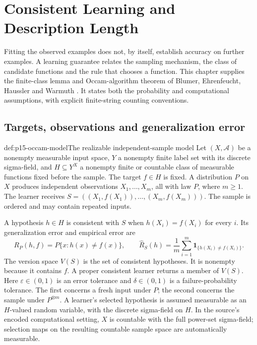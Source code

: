 \chapter{Consistent Learning and Description Length}
\label{sec:p15-occam-learning}

Fitting the observed examples does not, by itself, establish accuracy
on further examples. A learning guarantee relates the sampling mechanism,
the class of candidate functions and the rule that chooses a function.
This chapter supplies the finite-class lemma and Occam-algorithm theorem
of Blumer, Ehrenfeucht, Haussler and Warmuth
\cite[Lemma~2.1, Definition~2.2 and Theorem~2.3]{BlumerEtAl1987Occam}.
It states both the probability and computational assumptions, with
explicit finite-string counting conventions.

\section{Targets, observations and generalization error}

\begin{hbdefinition}{def:p15-occam-model}{The realizable independent-sample model}
Let \((X,\mathcal A)\) be a nonempty measurable input space,
\(Y\) a nonempty finite label set with its discrete sigma-field, and
\(H\subseteq Y^X\) a nonempty finite or countable class of measurable
functions fixed before the sample. The target
\(f\in H\) is fixed. A distribution \(P\) on \(X\) produces independent
observations \(X_1,\ldots,X_m\), all with law \(P\), where \(m\geq1\).
The learner receives
\(S=((X_1,f(X_1)),\ldots,(X_m,f(X_m)))\).
The sample is ordered and may contain repeated inputs.

A hypothesis \(h\in H\) is consistent with \(S\) when
\(h(X_i)=f(X_i)\) for every \(i\). Its generalization error and
empirical error are
\[
 R_P(h,f)=P\{x:h(x)\ne f(x)\},\qquad
 \widehat R_S(h)=\frac1m\sum_{i=1}^m
                       \mathbf1_{\{h(X_i)\ne f(X_i)\}}.
\]
The version space \(V(S)\) is the set of consistent hypotheses.
It is nonempty because it contains \(f\).
A proper consistent learner returns a member of \(V(S)\).
Here \(\varepsilon\in(0,1)\) is an error tolerance and
\(\delta\in(0,1)\) is a failure-probability tolerance. The first
concerns a fresh input under \(P\); the second concerns the sample
under \(P^{\otimes m}\). A learner's selected hypothesis is assumed
measurable as an \(H\)-valued random variable, with the discrete
sigma-field on \(H\). In the source's encoded computational setting,
\(X\) is countable with the full power-set sigma-field; selection
maps on the resulting countable sample space are automatically measurable.
\end{hbdefinition}

